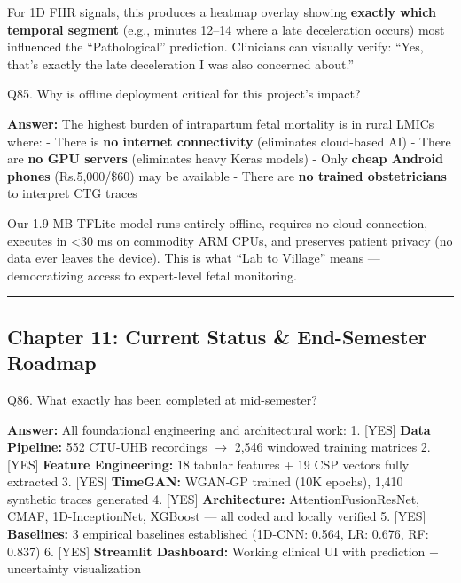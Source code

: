 \documentclass[11pt,a4paper]{article}
\begin{document}
For 1D FHR signals, this produces a heatmap overlay showing
\textbf{exactly which temporal segment} (e.g., minutes 12--14 where a
late deceleration occurs) most influenced the ``Pathological''
prediction. Clinicians can visually verify: ``Yes, that's exactly the
late deceleration I was also concerned about.''

\begin{questionbox}
Q85. Why is offline deployment critical for this project's
impact?
\end{questionbox}
\textbf{Answer:} The highest burden of intrapartum fetal mortality is in
rural LMICs where: - There is \textbf{no internet connectivity}
(eliminates cloud-based AI) - There are \textbf{no GPU servers}
(eliminates heavy Keras models) - Only \textbf{cheap Android phones}
(Rs.5,000/\$60) may be available - There are \textbf{no trained
obstetricians} to interpret CTG traces

Our 1.9 MB TFLite model runs entirely offline, requires no cloud
connection, executes in \textless30 ms on commodity ARM CPUs, and
preserves patient privacy (no data ever leaves the device). This is what
``Lab to Village'' means --- democratizing access to expert-level fetal
monitoring.

\begin{center}\rule{0.5\linewidth}{0.5pt}\end{center}

\subsection{Chapter 11: Current Status \& End-Semester
Roadmap}\label{chapter-11-current-status-end-semester-roadmap}

\begin{questionbox}
Q86. What exactly has been completed at mid-semester?
\end{questionbox}
\textbf{Answer:} All foundational engineering and architectural work: 1. {\color{green}\textsf{[YES]}}
\textbf{Data Pipeline:} 552 CTU-UHB recordings $\rightarrow$ 2,546 windowed training
matrices 2. {\color{green}\textsf{[YES]}} \textbf{Feature Engineering:} 18 tabular features + 19
CSP vectors fully extracted 3. {\color{green}\textsf{[YES]}} \textbf{TimeGAN:} WGAN-GP trained (10K
epochs), 1,410 synthetic traces generated 4. {\color{green}\textsf{[YES]}} \textbf{Architecture:}
AttentionFusionResNet, CMAF, 1D-InceptionNet, XGBoost --- all coded and
locally verified 5. {\color{green}\textsf{[YES]}} \textbf{Baselines:} 3 empirical baselines
established (1D-CNN: 0.564, LR: 0.676, RF: 0.837) 6. {\color{green}\textsf{[YES]}}
\textbf{Streamlit Dashboard:} Working clinical UI with prediction +
uncertainty visualization
\end{document}
